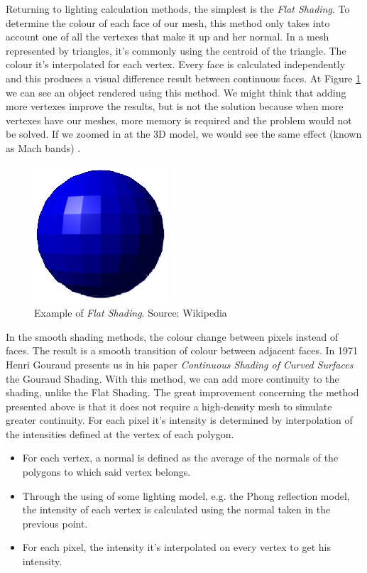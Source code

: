 \documentclass[titlepage,12pt]{report}
\begin{document}
Returning to lighting calculation methods, the simplest is the \textit{Flat Shading}. To determine the colour of each face of our mesh, this method only takes into account one of all the vertexes that make it up and her normal. In a mesh represented by triangles, it's commonly using the centroid of the triangle. The colour it's interpolated for each vertex. Every face is calculated independently and this produces a visual difference result between continuous faces. At Figure \ref{flat:shading} we can see an object rendered using this method. We might think that adding more vertexes improve the results, but is not the solution because when more vertexes have our meshes, more memory is required and the problem would not be solved. If we zoomed in at the 3D model, we would see the same effect (known as Mach bands) \citep{Lotto1999}.

\begin{figure}[ht]
	\centering
	\includegraphics[scale=0.5]{media/Flat-shading-sample.png}
	\caption{Example of \textit{Flat Shading}. Source: Wikipedia}
	\label{flat:shading}
\end{figure}

In the smooth shading methods, the colour change between pixels instead of faces. The result is a smooth transition of colour between adjacent faces.
In 1971 Henri Gouraud presents us in his paper \textit{Continuous Shading of Curved Surfaces} \citep{Henri1971} the Gouraud Shading. With this method, we can add more continuity to the shading, unlike the Flat Shading. The great improvement concerning the method presented above is that it does not require a high-density mesh to simulate greater continuity. For each pixel it's intensity is determined by interpolation of the intensities defined at the vertex of each polygon.

\begin{itemize}
	\item For each vertex, a normal is defined as the average of the normals of the polygons to which said vertex belongs.
	\item Through the using of some lighting model,  e.g. the Phong reflection model, the intensity of each vertex is calculated using the normal taken in the previous point.
	\item For each pixel, the intensity it's interpolated on every vertex to get his intensity.
\end{itemize} 
\end{document}
